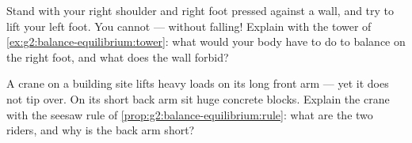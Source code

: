 \begin{exercise}[$\star$]\label{exo:g2:balance-equilibrium:9}
Stand with your right shoulder and right foot pressed against a
wall, and try to lift your left foot. You cannot --- without
falling! Explain with the tower of
\cref{ex:g2:balance-equilibrium:tower}: what would your body have to
do to balance on the right foot, and what does the wall forbid?
\end{exercise}

\begin{exercise}[$\star\star$]\label{exo:g2:balance-equilibrium:10}
A crane on a building site lifts heavy loads on its long front arm
--- yet it does not tip over. On its short back arm sit huge
concrete blocks. Explain the crane with the seesaw rule of
\cref{prop:g2:balance-equilibrium:rule}: what are the two riders,
and why is the back arm short?
\end{exercise}

